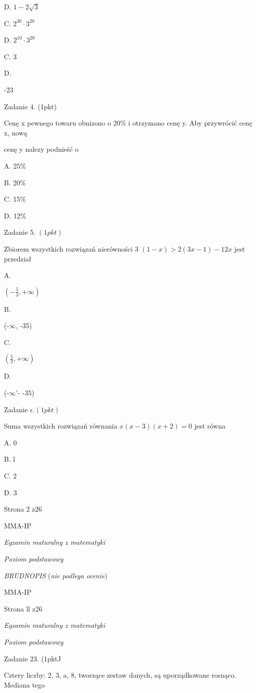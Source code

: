 \documentclass[a4paper,12pt]{article}
\begin{document}
D. $1-2\sqrt{3}$

C. $2^{30}\cdot 3^{20}$

D. $2^{10}\cdot 3^{20}$

C. 3

D.

-23

Zadanie 4. (1pkt)

Cenę x pewnego towaru obnizono o 20\% i otrzymano cenę y. Aby przywrócić cenę x, nową

cenę y nalezy podnieść o

A. 25\%

B. 20\%

C. 15\%

D. 12\%

Zadanie 5. $(1pkt)$

Zbiorem wszystkich rozwiązań nierówności 3 $(1-x)>2(3x-1)-12x$ jest przedział

A.

$(-\displaystyle \frac{5}{3},+\infty)$

B.

(-$\infty$, -35)

C.

$(\displaystyle \frac{5}{3},+\infty)$

D.

(-$\infty$'- -35)

Zadanie $\epsilon. (1pkt)$

Suma wszystkich rozwiązań równania $x(x-3)(x+2)=0$ jest równa

A. 0

B. l

C. 2

D. 3

Strona 2 z26

MMA-IP





{\it Egzamin maturalny z matematyki}

{\it Poziom podstawowy}

{\it BRUDNOPIS} ({\it nie podlega ocenie})

MMA-IP

Strona ll z26





{\it Egzamin maturalny z matematyki}

{\it Poziom podstawowy}

Zadanie 23. (1pktJ

Cztery liczby: 2, 3, a, 8, tworzące zestaw danych, są uporządkowane rosnąco. Mediana tego
\end{document}
